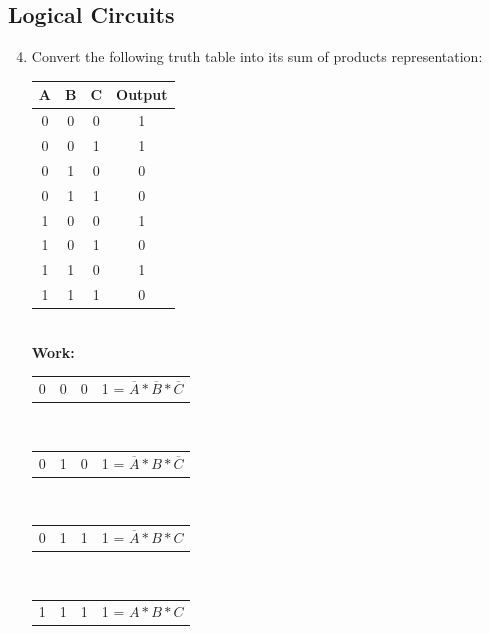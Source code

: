 \documentclass[11pt]{article}
\begin{document}
\subsection{Logical Circuits}
\begin{enumerate}
    \setcounter{enumi}{3}
    \item Convert the following truth table into its sum of products representation:\\
    \begin{tabular}{c c c | c}\\
            A & B & C & Output \\
        \hline
            0 & 0 & 0 & 1 \\
            0 & 0 & 1 & 1 \\
            0 & 1 & 0 & 0 \\
            0 & 1 & 1 & 0 \\
            1 & 0 & 0 & 1 \\
            1 & 0 & 1 & 0 \\
            1 & 1 & 0 & 1 \\
            1 & 1 & 1 & 0 \\
    \end{tabular}\\
    \textbf{Work:}
    \begin{center}
        \begin{tabular}{c c c | c}
            0 & 0 & 0 & 1  = $\overline{A} * \overline{B} * \overline{C}$\\
        \end{tabular}\\
        \begin{tabular}{c c c | c}\\
            0 & 1 & 0 & 1  = $\overline{A} * B * \overline{C}$\\
        \end{tabular}\\
        \begin{tabular}{c c c | c}\\
            0 & 1 & 1 & 1  = $\overline{A} * B * C$\\
        \end{tabular}\\
        \begin{tabular}{c c c | c}\\
            1 & 1 & 1 & 1  = $A * B * C$\\
        \end{tabular}\\[0.15in]
    \end{center}


\end{enumerate}
\end{document}
